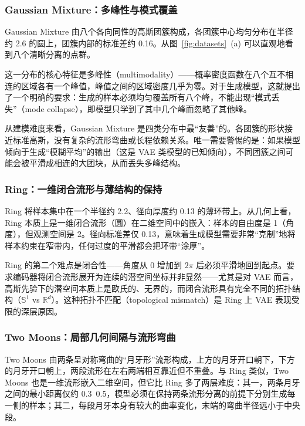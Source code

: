 \documentclass[UTF8,a4paper,12pt]{ctexart}
\begin{document}
\subsubsection{Gaussian Mixture：多峰性与模式覆盖}

Gaussian Mixture 由八个各向同性的高斯团簇构成，各团簇中心均匀分布在半径约 2.6 的圆上，团簇内部的标准差约 0.16。从图~\ref{fig:datasets}~(a) 可以直观地看到八个清晰分离的点群。

这一分布的核心特征是多峰性（multimodality）——概率密度函数在八个互不相连的区域各有一个峰值，峰值之间的区域密度几乎为零。对于生成模型，这就提出了一个明确的要求：生成的样本必须均匀覆盖所有八个峰，不能出现“模式丢失”（mode collapse），即模型只学到了其中几个峰而忽略了其他峰。

从建模难度来看，Gaussian Mixture 是四类分布中最“友善”的。各团簇的形状接近标准高斯，没有复杂的流形弯曲或长程依赖关系。唯一需要警惕的是：如果模型倾向于生成“模糊平均”的输出（这是 VAE 类模型的已知倾向），不同团簇之间可能会被平滑成相连的大团块，从而丢失多峰结构。

\subsubsection{Ring：一维闭合流形与薄结构的保持}

Ring 将样本集中在一个半径约 2.2、径向厚度约 0.13 的薄环带上。从几何上看，Ring 本质上是一维闭合流形（圆）在二维空间中的嵌入：样本的自由度是 1（角度），但观测空间是 2。径向标准差仅 0.13，意味着生成模型需要非常“克制”地将样本约束在窄带内，任何过度的平滑都会把环带“涂厚”。

Ring 的第二个难点是闭合性——角度从 0 增加到 $2\pi$ 后必须平滑地回到起点。要求编码器将闭合流形展开为连续的潜空间坐标并非显然——尤其是对 VAE 而言，高斯先验下的潜空间本质上是欧氏的、无界的，而闭合流形具有完全不同的拓扑结构（$\mathbb{S}^1$ vs $\mathbb{R}^d$）。这种拓扑不匹配（topological mismatch）是 Ring 上 VAE 表现受限的深层原因。

\subsubsection{Two Moons：局部几何间隔与流形弯曲}

Two Moons 由两条呈对称弯曲的“月牙形”流形构成，上方的月牙开口朝下，下方的月牙开口朝上，两段流形在左右两端相互靠近但不重叠。与 Ring 类似，Two Moons 也是一维流形嵌入二维空间，但它比 Ring 多了两层难度：其一，两条月牙之间的最小距离仅约 0.3~0.5，模型必须在保持两条流形分离的前提下分别生成每一侧的样本；其二，每段月牙本身有较大的曲率变化，末端的弯曲半径远小于中央段。
\end{document}
